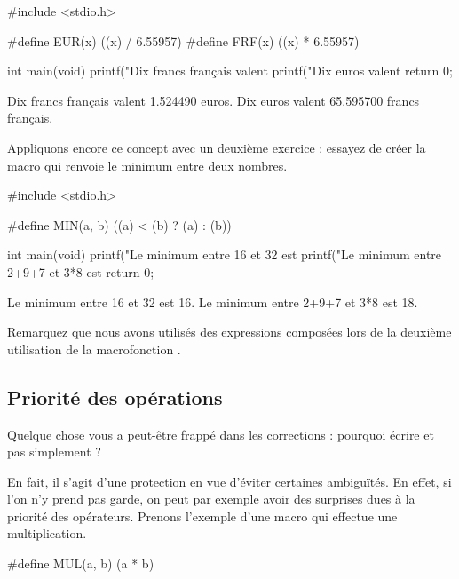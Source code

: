 \begin{C}
#include <stdio.h>

#define EUR(x) ((x) / 6.55957)
#define FRF(x) ((x) * 6.55957)

int main(void)
{
   printf("Dix francs français valent %
   printf("Dix euros valent %
   return 0;
}
\end{C}

\begin{C}
Dix francs français valent 1.524490 euros.
Dix euros valent 65.595700 francs français.
\end{C}


Appliquons encore ce concept avec un deuxième exercice : essayez de
créer la macro  qui renvoie le minimum entre deux nombres.

\begin{C}
 #include <stdio.h>

#define MIN(a, b)  ((a) < (b) ? (a) : (b))

int main(void)
{
   printf("Le minimum entre 16 et 32 est %
   printf("Le minimum entre 2+9+7 et 3*8 est %
   return 0;
}
\end{C}

\begin{C}
Le minimum entre 16 et 32 est 16.
Le minimum entre 2+9+7 et 3*8 est 18.
\end{C}

\begin{infobox}
 Remarquez que nous avons utilisés des expressions
composées lors de la deuxième utilisation de la macrofonction
.
\end{infobox}


\subsection{Priorité des opérations}
\label{priorite-des-operations}

Quelque chose vous a peut-être frappé dans les corrections : pourquoi
écrire  et pas simplement  ?

En fait, il s'agit d'une protection en vue d'éviter certaines
ambiguïtés. En effet, si l'on n'y prend pas garde, on peut par exemple
avoir des surprises dues à la priorité des opérateurs. Prenons l'exemple
d'une macro  qui effectue une multiplication.

\begin{C}
#define MUL(a, b)  (a * b)
\end{C}

